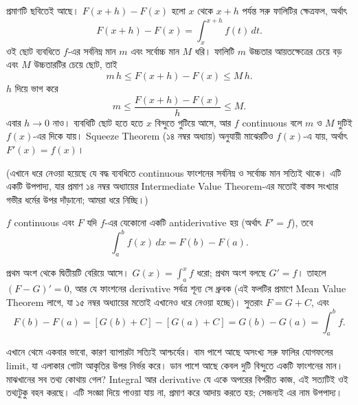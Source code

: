 \documentclass[11pt]{article}
\begin{document}
\begin{center}
\end{center}

প্রমাণটি ছবিতেই আছে। $F(x+h) - F(x)$ হলো $x$ থেকে $x+h$ পর্যন্ত সরু ফালিটির
ক্ষেত্রফল, অর্থাৎ
\[
  F(x+h) - F(x) = \int_{x}^{x+h} f(t)\,dt .
\]
ওই ছোট ব্যবধিতে $f$-এর সর্বনিম্ন মান $m$ এবং সর্বোচ্চ মান $M$ ধরি। ফালিটি
$m$ উচ্চতার আয়তক্ষেত্রের চেয়ে বড় এবং $M$ উচ্চতারটির চেয়ে ছোট, তাই
\[
  m\,h \leq F(x+h) - F(x) \leq M\,h .
\]
$h$ দিয়ে ভাগ করে
\[
  m \leq \frac{F(x+h)-F(x)}{h} \leq M .
\]
এবার $h \to 0$ নাও। ব্যবধিটি ছোট হতে হতে $x$ বিন্দুতে গুটিয়ে আসে, আর $f$
continuous বলে $m$ ও $M$ দুটিই $f(x)$-এর দিকে যায়। Squeeze Theorem
(১৪ নম্বর অধ্যায়) অনুযায়ী মাঝেরটিও $f(x)$-এ যায়, অর্থাৎ $F'(x) = f(x)$।

(এখানে ধরে নেওয়া হয়েছে যে বদ্ধ ব্যবধিতে continuous ফাংশনের সর্বনিম্ন ও
সর্বোচ্চ মান সত্যিই থাকে। এটি একটি উপপাদ্য, যার প্রমাণ ১৪ নম্বর অধ্যায়ের
Intermediate Value Theorem-এর মতোই বাস্তব সংখ্যার গভীর ধর্মের উপর দাঁড়ানো;
আমরা ধরে নিচ্ছি।)

\begin{idea}[মৌলিক উপপাদ্য, দ্বিতীয় অংশ]
$f$ continuous এবং $F$ যদি $f$-এর যেকোনো একটি antiderivative হয় (অর্থাৎ
$F' = f$), তবে
\[
  \int_{a}^{b} f(x)\,dx = F(b) - F(a) .
\]
\end{idea}

প্রথম অংশ থেকে দ্বিতীয়টি বেরিয়ে আসে। $G(x) = \int_{a}^{x}f$ ধরো; প্রথম অংশ
বলছে $G' = f$। তাহলে $(F-G)' = 0$, আর যে ফাংশনের derivative সর্বত্র শূন্য সে
ধ্রুবক (এই ফলটির প্রমাণে Mean Value Theorem লাগে, যা ১৫ নম্বর অধ্যায়ের
মতোই এখানেও ধরে নেওয়া হচ্ছে)। সুতরাং $F = G + C$, এবং
\[
  F(b) - F(a) = \left[ G(b)+C \right] - \left[ G(a)+C \right]
  = G(b) - G(a) = \int_{a}^{b}f.
\]

\begin{remark}
এখানে থেমে একবার ভাবো, কারণ ব্যাপারটা সত্যিই আশ্চর্যের। বাম পাশে আছে অসংখ্য
সরু ফালির যোগফলের limit, যা এলাকার গোটা আকৃতির উপর নির্ভর করে। ডান পাশে আছে
কেবল দুটি বিন্দুতে একটি ফাংশনের মান। মাঝখানের সব তথ্য কোথায় গেল? Integral আর
derivative যে একে অপরের বিপরীত কাজ, এই সত্যটিই ওই তথ্যটুকু বহন করছে। এটি
সংজ্ঞা দিয়ে পাওয়া যায় না, প্রমাণ করে আদায় করতে হয়; সেজন্যই এর নাম
উপপাদ্য।
\end{remark}
\end{document}
